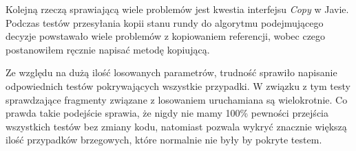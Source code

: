 Kolejną rzeczą sprawiającą wiele problemów jest kwestia interfejsu \textit{Copy} w Javie. Podczas testów przesyłania kopii stanu rundy do algorytmu podejmującego decyzje powstawało wiele problemów z kopiowaniem referencji, wobec czego postanowiłem ręcznie napisać metodę kopiującą.

Ze względu na dużą ilość losowanych parametrów, trudność sprawiło napisanie odpowiednich testów pokrywających wszystkie przypadki. W związku z tym testy sprawdzające fragmenty związane z losowaniem uruchamiana są wielokrotnie. Co prawda takie podejście sprawia, że nigdy nie mamy 100\% pewności przejścia wszystkich testów bez zmiany kodu, natomiast pozwala wykryć znacznie większą ilość przypadków brzegowych, które normalnie nie były by pokryte testem.